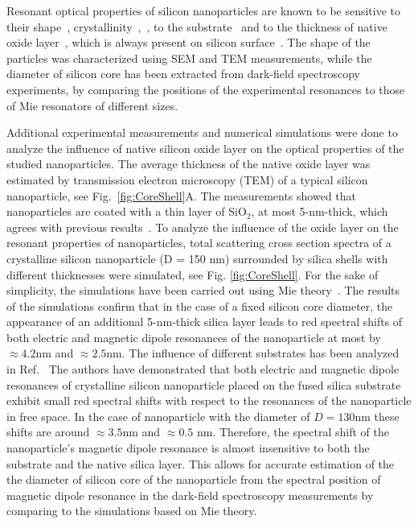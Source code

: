         Resonant optical properties of silicon nanoparticles are known to be sensitive to their shape~\cite{zywietz2015electromagnetic},
        crystallinity~\cite{zywietz2015electromagnetic},~, to the substrate~\cite{miroshnichenko2015substrate} and
        to the thickness of native oxide layer~\cite{zywietz2015electromagnetic, fu2012directional},
        which is always present on silicon surface~\cite{morita1990growth}. The shape of the particles was characterized using
        SEM and TEM measurements, while the diameter of silicon core has been extracted from dark-field spectroscopy experiments, by
        comparing the positions of the experimental resonances to those of Mie resonators of different sizes.

        Additional experimental measurements and numerical simulations were done to analyze the influence of native silicon oxide layer
        on the optical properties of the studied nanoparticles. The average thickness of the native oxide layer was
        estimated by transmission electron microscopy (TEM) of a typical silicon nanoparticle, see Fig.~\ref{fig:CoreShell}A.
        The measurements showed that nanoparticles are coated with a thin layer of SiO$_2$, at most 5-nm-thick, which agrees
        with previous results~\cite{zywietz2015electromagnetic, fu2012directional}.
        To analyze the influence of the oxide layer on the resonant properties of nanoparticles,
        total scattering cross section spectra of a crystalline silicon nanoparticle (D = 150 nm) surrounded by
        silica shells with different thicknesses were simulated, see Fig. \ref{fig:CoreShell}. For the sake of simplicity, the simulations have been carried out
        using Mie theory~\cite{bohren1983absorption}. The results of the simulations confirm that in the case of a fixed silicon core diameter, the appearance of an additional
        5-nm-thick silica layer leads to red spectral shifts of both electric and magnetic dipole resonances of the
        nanoparticle at most by $≈ 4.2$nm and $≈ 2.5$nm. The influence of different substrates has been analyzed in
        Ref.~\cite{miroshnichenko2015substrate} The authors have demonstrated that both electric and magnetic dipole resonances of
        crystalline silicon nanoparticle
        placed on the fused silica substrate exhibit small red spectral shifts with respect to the resonances of the nanoparticle
        in free space. In the case of nanoparticle with the diameter of $D = 130 $nm these shifts are around $≈ 3.5 $nm and $≈ 0.5$ nm.
        Therefore, the spectral shift of the nanoparticle’s magnetic dipole resonance is almost insensitive to both
        the substrate and the native silica layer. This allows for accurate estimation of the the diameter of silicon core of the nanoparticle
        from the spectral position of magnetic dipole resonance in the dark-field spectroscopy measurements by
        comparing to the simulations based on Mie theory.


